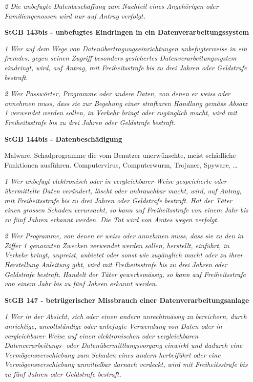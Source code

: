 \textit{2 Die unbefugte Datenbeschaffung zum Nachteil eines Angehörigen oder Familiengenossen wird nur auf Antrag verfolgt.}
\vspace{3mm}

\noindent
\textbf{StGB 143bis - unbefugtes Eindringen in ein Datenverarbeitungssystem}

\textit{1 Wer auf dem Wege von Datenübertragungseinrichtungen unbefugterweise in ein fremdes, gegen seinen Zugriff besonders gesichertes Datenverarbeitungssystem eindringt, wird, auf Antrag, mit Freiheitsstrafe bis zu drei Jahren oder Geldstrafe bestraft.}

\textit{2 Wer Passwörter, Programme oder andere Daten, von denen er weiss oder annehmen muss, dass sie zur Begehung einer strafbaren Handlung gemäss Absatz 1 verwendet werden sollen, in Verkehr bringt oder zugänglich macht, wird mit Freiheitsstrafe bis zu drei Jahren oder Geldstrafe bestraft.}
\vspace{3mm}

\noindent
\textbf{StGB 144bis - Datenbeschädigung}

Malware, Schadprogramme die vom Benutzer unerwünschte, meist schädliche Funktionen ausführen. Computervirus, Computerwurm, Trojaner, Spyware, \ldots

\textit{1 Wer unbefugt elektronisch oder in vergleichbarer Weise gespeicherte oder übermittelte Daten verändert, löscht oder unbrauchbar macht, wird, auf Antrag, mit Freiheitsstrafe bis zu drei Jahren oder Geldstrafe bestraft. 
Hat der Täter einen grossen Schaden verursacht, so kann auf Freiheitsstrafe von einem Jahr bis zu fünf Jahren erkannt werden. Die Tat wird von Amtes wegen verfolgt.}

\textit{2 Wer Programme, von denen er weiss oder annehmen muss, dass sie zu den in Ziffer 1 genannten Zwecken verwendet werden sollen, herstellt, einführt, in Verkehr bringt, anpreist, anbietet oder sonst wie zugänglich macht oder zu ihrer Herstellung Anleitung gibt, wird mit Freiheitsstrafe bis zu drei Jahren oder Geldstrafe bestraft.
Handelt der Täter gewerbsmässig, so kann auf Freiheitsstrafe von einem Jahr bis zu fünf Jahren erkannt werden.}
\vspace{3mm}

\noindent
\textbf{StGB 147 - betrügerischer Missbrauch einer Datenverarbeitungsanlage}

\textit{1 Wer in der Absicht, sich oder einen andern unrechtmässig zu bereichern, durch unrichtige, unvollständige oder unbefugte Verwendung von Daten oder in vergleichbarer Weise auf einen elektronischen oder vergleichbaren Datenverarbeitungs- oder Datenübermittlungsvorgang einwirkt und dadurch eine Vermögensverschiebung zum Schaden eines andern herbeiführt oder eine Vermögensverschiebung unmittelbar darnach verdeckt, wird mit Freiheitsstrafe bis zu fünf Jahren oder Geldstrafe bestraft.}

